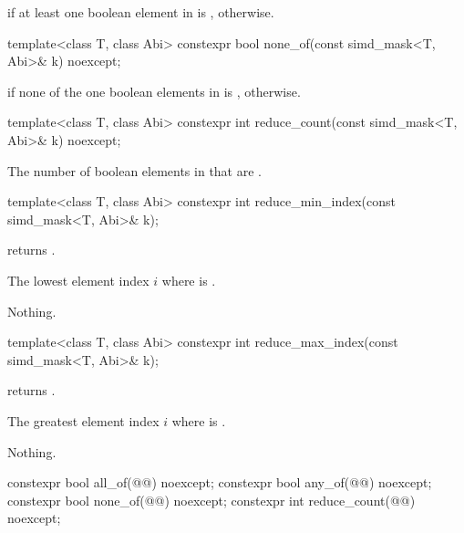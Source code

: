 \begin{itemdescr}
  \pnum\returns
   if at least one boolean element in  is ,  otherwise.
\end{itemdescr}

\begin{itemdecl}
template<class T, class Abi> constexpr bool none_of(const simd_mask<T, Abi>& k) noexcept;
\end{itemdecl}

\begin{itemdescr}
  \pnum\returns
   if none of the one boolean elements in  is ,  otherwise.
\end{itemdescr}

\begin{itemdecl}
template<class T, class Abi> constexpr int reduce_count(const simd_mask<T, Abi>& k) noexcept;
\end{itemdecl}

\begin{itemdescr}
  \pnum\returns
  The number of boolean elements in  that are .
\end{itemdescr}

\begin{itemdecl}
template<class T, class Abi> constexpr int reduce_min_index(const simd_mask<T, Abi>& k);
\end{itemdecl}

\begin{itemdescr}
  \pnum\requires
   returns .

  \pnum\returns
  The lowest element index $i$ where  is .

  \pnum\throws Nothing.
\end{itemdescr}

\begin{itemdecl}
template<class T, class Abi> constexpr int reduce_max_index(const simd_mask<T, Abi>& k);
\end{itemdecl}

\begin{itemdescr}
  \pnum\requires
   returns .

  \pnum\returns
  The greatest element index $i$ where  is .

  \pnum\throws Nothing.
\end{itemdescr}

\begin{itemdecl}
constexpr bool all_of(@@) noexcept;
constexpr bool any_of(@@) noexcept;
constexpr bool none_of(@@) noexcept;
constexpr int reduce_count(@@) noexcept;
\end{itemdecl}

